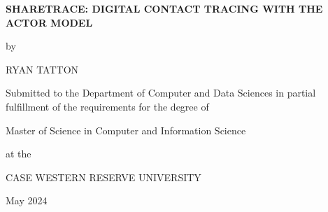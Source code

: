 \begin{titlepage}
\centering

\Large

\uppercase{\textbf{SHARETRACE: DIGITAL CONTACT TRACING WITH THE ACTOR MODEL}}

\vspace{0.1in}

\large

by

\vspace{0.1in}

\Large

\uppercase{Ryan Tatton}

\vspace{0.1in}

\large

Submitted to the Department of Computer and Data Sciences in partial
fulfillment of the requirements for the degree of

\vspace{0.1in}

Master of Science in Computer and Information Science

\vspace{0.1in}

at the

\vspace{0.1in}

\uppercase{Case Western Reserve University}

\vspace{0.1in}

May 2024
\end{titlepage}